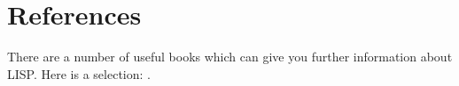 \section{References}

There are a number of useful books which can give you further information
about LISP. Here is a selection:
\cite{AllenLisp1980,Lisp1.5:1962,Touretzky:1984,WinstonHornLisp}.


